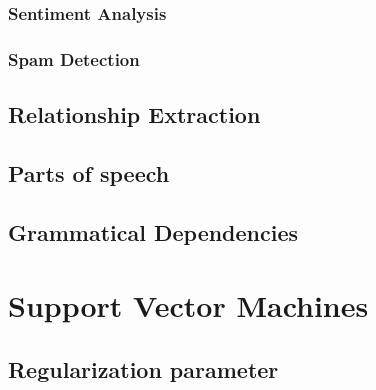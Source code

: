 \subsubsection{Sentiment Analysis}

\subsubsection{Spam Detection}


\subsection{Relationship Extraction}\label{sec:RE}

\subsection{Parts of speech}

\subsection{Grammatical Dependencies}

\section{Support Vector Machines}\label{sec:SVM}

\subsection{Regularization parameter} \label{subsec:RegPar}
